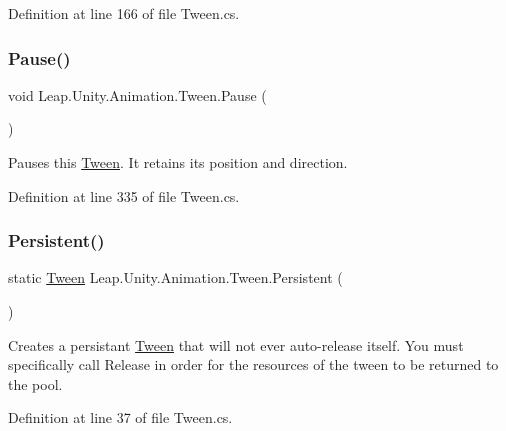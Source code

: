 Definition at line 166 of file Tween.\+cs.

\mbox{\label{struct_leap_1_1_unity_1_1_animation_1_1_tween_a081bc17380d04763af8322c31b1ab887}} 
\subsubsection{\texorpdfstring{Pause()}{Pause()}}
{\footnotesize\ttfamily void Leap.\+Unity.\+Animation.\+Tween.\+Pause (\begin{DoxyParamCaption}{ }\end{DoxyParamCaption})}



Pauses this \mbox{\hyperlink{struct_leap_1_1_unity_1_1_animation_1_1_tween}{Tween}}. It retains its position and direction. 



Definition at line 335 of file Tween.\+cs.

\mbox{\label{struct_leap_1_1_unity_1_1_animation_1_1_tween_a4e3149fd5f794b71c50a8bb18b6d338e}} 
\subsubsection{\texorpdfstring{Persistent()}{Persistent()}}
{\footnotesize\ttfamily static \mbox{\hyperlink{struct_leap_1_1_unity_1_1_animation_1_1_tween}{Tween}} Leap.\+Unity.\+Animation.\+Tween.\+Persistent (\begin{DoxyParamCaption}{ }\end{DoxyParamCaption})\hspace{0.3cm}{\ttfamily [static]}}



Creates a persistant \mbox{\hyperlink{struct_leap_1_1_unity_1_1_animation_1_1_tween}{Tween}} that will not ever auto-\/release itself. You must specifically call Release in order for the resources of the tween to be returned to the pool. 



Definition at line 37 of file Tween.\+cs.

